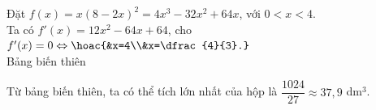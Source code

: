 \begin{ex}
{		Đặt $f(x)=x(8-2x)^2 = 4x^3 -32x^2 +64x$, với $0<x<4$.\\
		Ta có $f'(x)=12x^2 - 64x +64$, cho $f'(x)=0 \Leftrightarrow \hoac{&x=4\\&x=\dfrac{4}{3}.}$\\
		Bảng biến thiên
		\begin{center}
		\end{center}
		Từ bảng biến thiên, ta có thể tích lớn nhất của hộp là $\dfrac{1024}{27} \approx 37{,}9$ dm$^3$.
	}
\end{ex}

